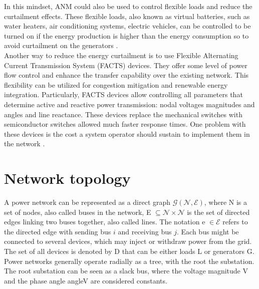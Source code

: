 In this mindset, \gls{ANM} could also be used to control flexible loads and reduce the curtailment effects. These flexible loads, also known as virtual batteries, such as water heaters, air conditioning systems, electric vehicles, can be controlled to be turned on if the energy production is higher than the energy consumption so to avoid curtailment on the generators \cite{flexibleloads}. \\
Another way to reduce the energy curtailment is to use Flexible Alternating Current Transmission System (\gls{FACTS}) devices. They offer some
level of power flow control and enhance the transfer capability over the existing network. This flexibility can be utilized for congestion
mitigation and renewable energy integration. Particularly, \gls{FACTS} devices allow controlling all parameters that determine active and reactive power transmission: nodal voltages magnitudes and angles and line reactance. These devices replace the mechanical switches with semiconductor switches allowed much faster response times. One problem with these devices is the cost a system operator should sustain to implement them in the network \cite{facts}.


\section{Network topology}
\label{sec:nt}
A power network can be represented as a direct graph $\mathcal{G}(\mathcal{N},\mathcal{E})$, where \gls{N} is a set of nodes, also called buses in the network, \gls{E} $\subseteq \mathcal{N} \times \mathcal{N}$ is the set of directed edges linking two buses together, also called lines. The notation \gls{e} $\in \mathcal{E}$ refers to the directed edge with sending bus $i$ and receiving bus $j$. Each bus might be connected to several devices, which may inject or withdraw power from the grid. The set of all devices is denoted by \gls{D} that can be either loads \gls{L} or generators \gls{G}. \\
Power networks generally operate radially as a tree, with the root the substation. The root substation can be seen as a slack bus, where the voltage magnitude \gls{V} and the phase angle \gls{angleV} are considered constants.

